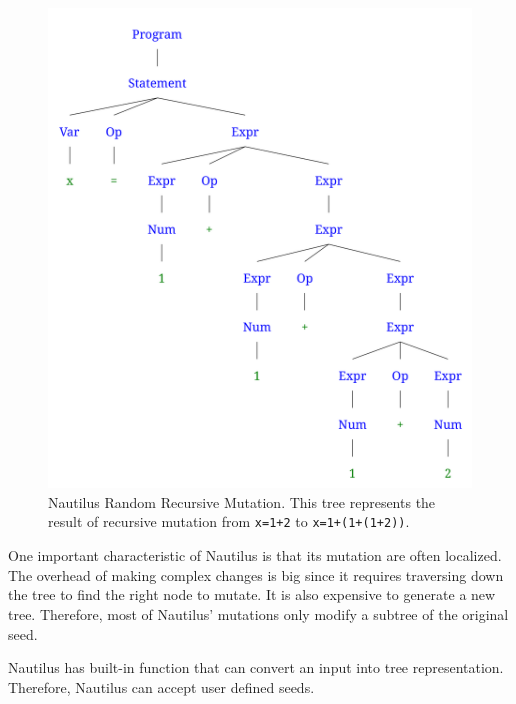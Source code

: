 \begin{figure}[h]
  \centering
  \includegraphics[scale=0.15]{images/parse-tree2.png}
  \caption{Nautilus Random Recursive Mutation. This tree represents the result of recursive mutation from \texttt{x=1+2} to \texttt{x=1+(1+(1+2))}.}\label{nautilus-tree-representation-after-recursive-mutation}
\end{figure}
One important characteristic of Nautilus is that its mutation are often localized. The overhead of making complex changes is big since it requires traversing down the tree to find the right node to mutate. It is also expensive to generate a new tree. Therefore, most of Nautilus' mutations only modify a subtree of the original seed. 

Nautilus has built-in function that can convert an input into tree representation. Therefore, Nautilus can accept user defined seeds.

